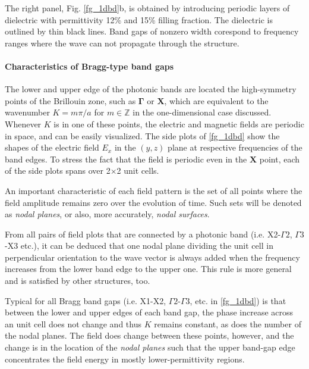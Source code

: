 The right panel, Fig. \ref{fg_1dbd}b, is obtained by introducing periodic layers of dielectric with permittivity 12\% and 15\% filling fraction. The dielectric is outlined by thin black lines. Band gaps of nonzero width corespond to frequency ranges where the wave can not propagate through the structure. %

\paragraph{Characteristics of Bragg-type band gaps}
The lower and upper edge of the photonic bands are located the high-symmetry points of the Brillouin zone, such as $\mathbf{\Gamma}$ or $\mathbf{X}$, which are equivalent to the wavenumber $K=m\pi/a$ for $m\in\mathbb{Z}$ in the one-dimensional case discussed. Whenever $K$ is in one of these points, the electric and magnetic fields are periodic in space, and can be easily visualized. The side plots of \ref{fg_1dbd} show the shapes of the electric field $E_x$ in the $(y,z)$ plane at respective frequencies of the band edges. To stress the fact that the field is periodic even in the $\mathbf{X}$ point, each of the side plots spans over 2$\times$2 unit cells. 

An important characteristic of each field pattern is the set of all points where the field amplitude remains zero over the evolution of time. Such sets will be denoted as \textit{nodal planes}, or also, more accurately, \textit{nodal surfaces}.

From all pairs of field plots that are connected by a photonic band (i.e. X2-$\Gamma2$, $\Gamma3$-X3 etc.), it can be deduced that one nodal plane dividing the unit cell in perpendicular orientation to the wave vector is always added when the frequency increases from the lower band edge to the upper one. This rule is more general and is satisfied by other structures, too. 

Typical for all Bragg band gaps (i.e. X1-X2, $\Gamma2$-$\Gamma3$, etc. in \ref{fg_1dbd}) is that between the lower and upper edges of each band gap, the phase increase across an unit cell does not change and thus $K$ remains constant, as does the number of the nodal planes. The field does change between these points, however, and the change is in the location of the \textit{nodal planes} such that the upper band-gap edge concentrates the field energy in mostly lower-permittivity regions. 

